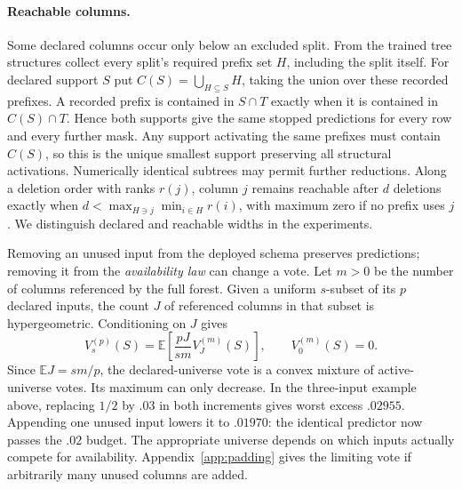\paragraph{Reachable columns.}
Some declared columns occur only below an excluded split. From the trained
tree structures collect every split's required prefix set $H$, including
the split itself. For declared support $S$ put
$C(S)=\bigcup_{H\subseteq S}H$, taking the union over these recorded
prefixes. A recorded prefix is contained in $S\cap T$ exactly when it
is contained in $C(S)\cap T$. Hence both supports give the same stopped
predictions for every row and every further mask. Any support activating
the same prefixes must contain $C(S)$, so this is the unique smallest
support preserving all structural activations. Numerically identical
subtrees may permit further reductions. Along a deletion order with
ranks $r(j)$, column $j$ remains reachable after $d$ deletions exactly when
$d<\max_{H\ni j}\min_{i\in H} r(i)$, with maximum zero if no prefix uses
$j$. We distinguish declared and reachable widths in the experiments.

Removing an unused input from the deployed schema preserves predictions;
removing it from the \emph{availability law} can change a vote. Let $m>0$
be the number of columns referenced by the full forest. Given a uniform
$s$-subset of its $p$ declared inputs, the count $J$ of referenced columns
in that subset is hypergeometric. Conditioning on $J$ gives
\[
 V_s^{(p)}(S)=\mathbb E\!\left[\frac{pJ}{sm}V_J^{(m)}(S)\right],
 \qquad V_0^{(m)}(S)=0 .
\]
Since $\mathbb E J=sm/p$, the declared-universe vote is a convex mixture
of active-universe votes. Its maximum can only decrease. In the three-input
example above, replacing $1/2$ by $.03$ in both increments gives worst
excess $.02955$. Appending one unused input lowers it to $.01970$:
the identical predictor now passes the $.02$ budget. The appropriate
universe depends on which inputs actually compete for availability.
Appendix~\ref{app:padding} gives the limiting vote if arbitrarily many
unused columns are added.
